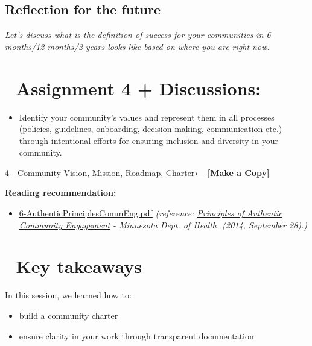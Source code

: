 \documentclass[
  letterpaper,
  DIV=11,
  numbers=noendperiod]{scrreport}
\providecommand{\tightlist}{%
  \setlength{\itemsep}{0pt}\setlength{\parskip}{0pt}}\usepackage{longtable,booktabs,array}
\begin{document}
\hypertarget{reflection-for-the-future}{%
\subsection{Reflection for the future}\label{reflection-for-the-future}}

\emph{Let's discuss what is the definition of success for your
communities in 6 months/12 months/2 years looks like based on where you
are right now.}

\hypertarget{assignment-4-discussions}{%
\section{\texorpdfstring{📝 \textbf{Assignment 4 +
Discussions:}}{📝 Assignment 4 + Discussions:}}\label{assignment-4-discussions}}

\begin{itemize}
\tightlist
\item
  Identify your community's values and represent them in all processes
  (policies, guidelines, onboarding, decision-making, communication
  etc.) through intentional efforts for ensuring inclusion and diversity
  in your community.
\end{itemize}

\href{https://docs.google.com/document/d/1c5NDGUnVc-L5DPop3UvpgOw3XuZHrY5B1wQ9mBWWoXg/edit?usp=sharing}{4
- Community Vision, Mission, Roadmap, Charter}\textbf{← {[}Make a
Copy{]}}

\textbf{Reading recommendation:}

\begin{itemize}
\tightlist
\item
  \href{https://drive.google.com/file/d/1dzTWPNXwPCAMZJBiEBf0a4c_y9F3Bvk1/view?usp=sharing}{6-AuthenticPrinciplesCommEng.pdf}
  \emph{(reference:}
  \href{https://www.health.state.mn.us/communities/practice/resources/phqitoolbox/authenticprinciples.html}{\emph{Principles
  of Authentic Community Engagement}} \emph{- Minnesota Dept. of Health.
  (2014, September 28).)}
\end{itemize}

\hypertarget{key-takeaways-3}{%
\section{🏡 Key takeaways}\label{key-takeaways-3}}

In this session, we learned how to:

\begin{itemize}
\tightlist
\item
  build a community charter
\item
  ensure clarity in your work through transparent documentation
\end{itemize}
\end{document}
